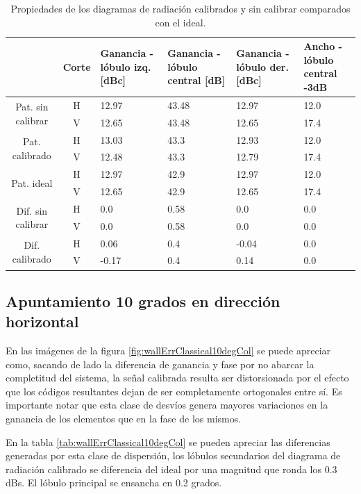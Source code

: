 \begin{table}[H]
  \footnotesize
  \centering
  \begin{tabular}{|c|c|p{2cm}|p{2.5cm}|p{2.5cm}|p{2.5cm}|}
    \cline{2-6}
    \multicolumn{1}{c|}{} & Corte & Ganancia - lóbulo izq. [dBc] & Ganancia - lóbulo central [dB] &
    Ganancia - lóbulo der. [dBc] & Ancho - lóbulo central -3dB \tabularnewline\hline
    \multirow{2}{2cm}{Pat. sin calibrar} & H & 12.97 & 43.48 & 12.97 & 12.0 \tabularnewline\cline{2-6}
     & V & 12.65 & 43.48 & 12.65 & 17.4 \tabularnewline\hline
    \multirow{2}{2cm}{Pat. calibrado} & H & 13.03 & 43.3 & 12.93 & 12.0 \tabularnewline\cline{2-6}
     & V & 12.48 & 43.3 & 12.79 & 17.4 \tabularnewline\hline
    \multirow{2}{2cm}{Pat. ideal} & H & 12.97 & 42.9 & 12.97 & 12.0 \tabularnewline\cline{2-6}
     & V & 12.65 & 42.9 & 12.65 & 17.4 \tabularnewline\hline
    \multirow{2}{2cm}{Dif. sin calibrar} & H & 0.0 & 0.58 & 0.0 & 0.0\tabularnewline\cline{2-6}
     & V & 0.0 & 0.58 & 0.0 & 0.0 \tabularnewline\hline
    \multirow{2}{2cm}{Dif. calibrado} & H & 0.06 & 0.4 & -0.04 & 0.0 \tabularnewline\cline{2-6}
     & V & -0.17 & 0.4 & 0.14 & 0.0 \tabularnewline\hline
  \end{tabular}
  \caption{Propiedades de los diagramas de radiación calibrados y sin calibrar comparados con el ideal.}
  \label{tab:wallErrClassical0deg}
\end{table}


\subsection{Apuntamiento 10 grados en dirección horizontal}

En las imágenes de la figura \ref{fig:wallErrClassical10degCol} se puede apreciar como, sacando de lado la diferencia de ganancia 
y fase por no abarcar la completitud del sistema, la señal calibrada resulta ser distorsionada por el efecto que los códigos 
resultantes dejan de ser completamente ortogonales entre sí. Es importante notar que esta clase de desvíos genera mayores 
variaciones en la ganancia de los elementos que en la fase de los mismos.
 
En la tabla \ref{tab:wallErrClassical10degCol} se pueden apreciar las diferencias generadas por esta clase de dispersión, los 
lóbulos secundarios del diagrama de radiación calibrado se diferencia del ideal por una magnitud que ronda los 0.3 dBs. El 
lóbulo principal se ensancha en 0.2 grados.

